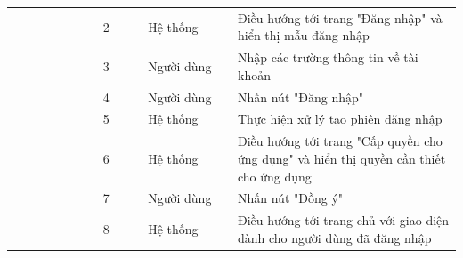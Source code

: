 \documentclass[../DoAn.tex]{subfiles}
\begin{document}
\begin{table}[ht]
\begin{tabular}{| p{0.2\linewidth} | p{0.1\linewidth} | p{0.2\linewidth} | p{0.5\linewidth} |}
                                                                     & \multicolumn{1}{p{0.1\linewidth}|}{2}                                                             & \multicolumn{1}{p{0.2\linewidth}|}{Hệ thống}               & \multicolumn{1}{p{0.5\linewidth}|}{Điều hướng tới trang "Đăng nhập" và hiển thị mẫu đăng nhập}                             \\ \cline{2-4}
                                                                     & \multicolumn{1}{p{0.1\linewidth}|}{3}                                                             & \multicolumn{1}{p{0.2\linewidth}|}{Người dùng}             & \multicolumn{1}{p{0.5\linewidth}|}{Nhập các trường thông tin về tài khoản}                                                 \\ \cline{2-4}
                                                                     & \multicolumn{1}{p{0.1\linewidth}|}{4}                                                             & \multicolumn{1}{p{0.2\linewidth}|}{Người dùng}             & \multicolumn{1}{p{0.5\linewidth}|}{Nhấn nút "Đăng nhập"}                                                                   \\ \cline{2-4}
                                                                     & \multicolumn{1}{p{0.1\linewidth}|}{5}                                                             & \multicolumn{1}{p{0.2\linewidth}|}{Hệ thống}               & \multicolumn{1}{p{0.5\linewidth}|}{Thực hiện xử lý tạo phiên đăng nhập}                                                    \\ \cline{2-4}
                                                                     & \multicolumn{1}{p{0.1\linewidth}|}{6}                                                             & \multicolumn{1}{p{0.2\linewidth}|}{Hệ thống}               & \multicolumn{1}{p{0.5\linewidth}|}{Điều hướng tới trang "Cấp quyền cho ứng dụng" và hiển thị quyền cần thiết cho ứng dụng} \\ \cline{2-4}
                                                                     & \multicolumn{1}{p{0.1\linewidth}|}{7}                                                             & \multicolumn{1}{p{0.2\linewidth}|}{Người dùng}             & \multicolumn{1}{p{0.5\linewidth}|}{Nhấn nút "Đồng ý"}                                                                      \\ \cline{2-4}
                                                                     & \multicolumn{1}{p{0.1\linewidth}|}{8}                                                             & \multicolumn{1}{p{0.2\linewidth}|}{Hệ thống}               & \multicolumn{1}{p{0.5\linewidth}|}{Điều hướng tới trang chủ với giao diện dành cho người dùng đã đăng nhập}                \\ \hline

\end{tabular}
\end{table}
\end{document}
